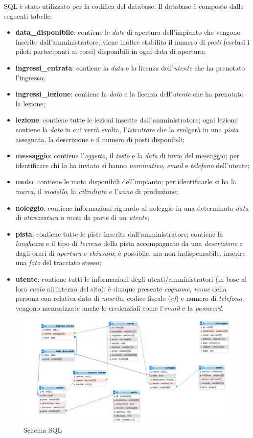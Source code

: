 SQL è stato utilizzato per la codifica del database. Il database è composto dalle seguenti tabelle:
\begin{itemize}
    \item \textbf{data\_disponibile}: contiene le \textit{date} di apertura dell'impianto che vengono
    inserite dall'amministratore; viene inoltre stabilito il numero di \textit{posti} (esclusi i piloti
    partecipanti ai corsi) disponibili in ogni data di apertura;
    \item \textbf{ingressi\_entrata}: contiene la \textit{data} e la licenza dell'\textit{utente} che ha prenotato l'ingresso;
    \item \textbf{ingressi\_lezione}: contiene la \textit{data} e la licenza dell'\textit{utente} che ha prenotato la lezione;
    \item \textbf{lezione}: contiene tutte le lezioni inserite dall'amministratore; ogni lezione contiene la \textit{data}
    in cui verrà svolta, l'\textit{istruttore} che la svolgerà in una \textit{pista} assegnata, la descrizione e il numero di posti disponibili;
    \item \textbf{messaggio}: contiene l'\textit{oggetto}, il \textit{testo} e la \textit{data} di invio del messaggio; per identificare
    chi lo ha inviato si hanno \textit{nominativo}, \textit{email} e \textit{telefono} dell'utente;
    \item \textbf{moto}: contiene le moto disponibili dell'impianto; per identificarle si ha la \textit{marca}, il \textit{modello},
    la \textit{cilindrata} e l'\textit{anno} di produzione;
    \item \textbf{noleggio}: contiene informazioni riguardo al noleggio in una determinata \textit{data} di \textit{attrezzatura} o
    \textit{moto} da parte di un \textit{utente};
    \item \textbf{pista}: contiene tutte le piste inserite dall'amministratore; contiene la \textit{lunghezza} e il tipo di \textit{terreno}
    della pista accompagnato da una \textit{descrizione} e dagli orari di \textit{apertura} e \textit{chiusura}; è possibile,
    ma non indispensabile, inserire una \textit{foto} del tracciato stesso;
    \item \textbf{utente}: contiene tutti le informazioni degli utenti/amministratori (in base al loro \textit{ruolo} all'interno del sito);
    è dunque presente \textit{cognome}, \textit{nome} della persona con relativa data di \textit{nascita}, codice fiscale (\textit{cf}) e
    numero di \textit{telefono}; vengono memorizzate anche le credenziali come l'\textit{email} e la \textit{password}.
\end{itemize}
\begin{figure}[H]
    \includegraphics[scale=0.4]{./res/schemaSQL.pdf}
    \centering
    \caption{Schema SQL}
\end{figure}
